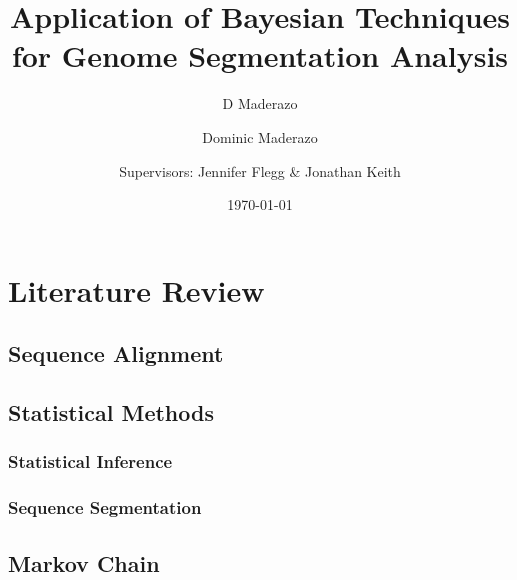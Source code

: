 \documentclass[12pt,a4paper]{report}
\author{D Maderazo}
\begin{document}
\title{Application of Bayesian Techniques for Genome Segmentation Analysis}
\date{\today}
\author{Dominic Maderazo\and Supervisors: Jennifer Flegg \& Jonathan Keith}
\maketitle

\chapter{Literature Review}

    
    
\section{Sequence Alignment}
    
	
\section{Statistical Methods}
\subsection{Statistical Inference}


\subsection{Sequence Segmentation}


\section{Markov Chain}



\newpage



\end{document}
